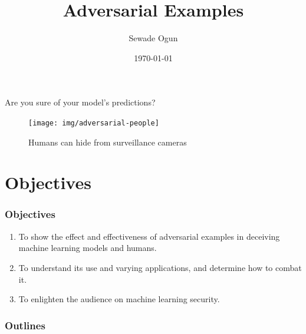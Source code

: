 \documentclass[12pt]{beamer}
\begin{document}
	\pagestyle{plain}
	\addtocounter{framenumber}{-1}
	\author{Sewade Ogun}
	\title{Adversarial Examples}
	\date{\today}
	\begin{frame}[plain]
	\maketitle
\end{frame}

\begin{frame}
	\Large{Are you sure of your model's predictions?}
	\begin{figure}
		\centering
		\texttt{[image: img/adversarial-people]}
		\label{fig:adversarial-people}
		\caption{Humans can hide from surveillance cameras  \protect\footnotemark}
	\end{figure}

\end{frame}

\section{Objectives}
\begin{frame}
\frametitle{Objectives}
\begin{enumerate}
	\item To show the effect and effectiveness of adversarial examples in deceiving machine learning models and humans.
	\item To understand its use and varying applications, and determine how to combat it.
	\item To enlighten the audience on machine learning security.
\end{enumerate}

\end{frame}

\begin{frame}
	\frametitle{Outlines}
	\tableofcontents
\end{frame}
\end{document}
